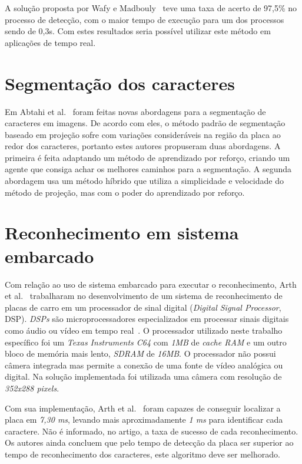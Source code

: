 A solução proposta por Wafy e Madbouly~\cite{wafy2016efficient} teve uma taxa de acerto de 97,5\% no processo de detecção, com o maior tempo de execução para um dos processos sendo de
0,3s. Com estes resultados seria possível utilizar este método em aplicações de tempo real.

\section{Segmentação dos caracteres}

Em Abtahi et al.~\cite{abtahi2015deep} foram feitas novas abordagens para a
segmentação de caracteres em imagens. De acordo com eles, o método padrão de
segmentação baseado em projeção sofre com variações consideráveis na região da
placa ao redor dos caracteres, portanto estes autores propuseram duas abordagens.
A primeira é feita adaptando um método de aprendizado por reforço, criando um agente que
consiga achar os melhores caminhos para a segmentação.  A segunda abordagem usa
um método híbrido que utiliza a simplicidade e velocidade do método de projeção,
mas com o poder do aprendizado por reforço.

\section{Reconhecimento em sistema embarcado}

Com relação ao uso de sistema embarcado para executar o reconhecimento, Arth et
al.~\cite{arth2007real} trabalharam no desenvolvimento de um sistema de reconhecimento
de placas de carro em um processador de sinal digital (\emph{Digital Signal Processor}, DSP).
\emph{DSPs} são microprocessadores especializados em
processar sinais digitais como áudio ou vídeo em tempo real~\cite{yovits1993advances}. O processador utilizado
neste trabalho específico foi um \emph{Texas Instruments C64} com \emph{1MB} de \emph{cache RAM} e um outro bloco
de memória mais lento, \emph{SDRAM} de \emph{16MB}. O processador não possui câmera integrada mas permite a conexão de
uma fonte de vídeo analógica ou digital. Na solução implementada foi utilizada uma câmera com resolução de \emph{352x288 pixels}.

Com sua implementação, Arth et al.~\cite{arth2007real} foram capazes de conseguir localizar a placa em
\emph{7,30 ms}, levando mais aproximadamente \emph{1 ms} para identificar cada caractere. Não é informado, no artigo,
a taxa de sucesso de cada reconhecimento. Os autores ainda
concluem que pelo tempo de detecção da placa ser superior ao tempo de
reconhecimento dos caracteres, este algoritmo deve ser melhorado.

